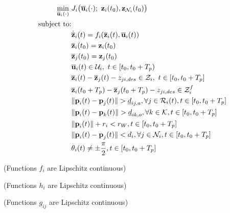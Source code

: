 \begin{align}
  \min\limits_{\overline{\bm{\mathbf{u}}}_i (\cdot)}\ &
    J_i \big(\overline{\bm{\mathbf{u}}}_i (\cdot);\ \bm{\mathbf{z}}_i(t_0), \bm{\mathbf{z}}_{\mathcal{N}_i}(t_0)\big) \\
  \text{subject to:} & \\
  & \dot{\overline{\bm{\mathbf{z}}}}_i(t) = f_i (\overline{\bm{\mathbf{z}}}_i (t), \overline{\bm{\mathbf{u}}}_i (t)) \\
  & \overline{\bm{\mathbf{z}}}_i (t_0) = \bm{\mathbf{z}}_i (t_0) \\
  & \overline{\bm{\mathbf{z}}}_j (t_0) = \bm{\mathbf{z}}_j (t_0) \\
  & \overline{\bm{\mathbf{u}}}_i(t) \in \mathcal{U}_i,\ t \in [t_0, t_0 + T_p)\\
  & \overline{\bm{\mathbf{z}}}_i (t) - \overline{\bm{\mathbf{z}}}_j (t) - z_{ji, des} \in \mathcal{Z}_i,\ t \in [t_0, t_0 + T_p]\\
  & \overline{\bm{\mathbf{z}}}_i (t_0 + T_p) - \overline{\bm{\mathbf{z}}}_j (t_0 + T_p) - z_{ji,des} \in \mathcal{Z}_i^f \\
  & \|\bm{\mathbf{p}}_i(t) - \bm{\mathbf{p}}_j(t)\| > \underline{d}_{ij,a}, \forall j \in \mathcal{R}_i(t), t \in [t_0, t_0 + T_p] \\
  & \|\bm{\mathbf{p}}_i(t) - \bm{\mathbf{p}}_k(t)\| > \underline{d}_{ik,o}, \forall k \in \mathcal{K}, t \in [t_0, t_0 + T_p] \\
  & \|\bm{\mathbf{p}}_i(t)\| + r_i < r_W, t \in [t_0, t_0 + T_p] \\
  & \|\bm{\mathbf{p}}_i(t) - \bm{\mathbf{p}}_j(t)\| < d_i, \forall j \in \mathcal{N}_i, t \in [t_0, t_0 + T_p] \\
  & \theta_i(t) \ne \pm \frac{\pi}{2}, t \in [t_0, t_0 + T_p]
\end{align}


\begin{gg_box}
\begin{assumption} (Functions $f_i$ are Lipschitz continuous)
  \label{ass:f_i_Lipschitz}
\end{assumption}
\end{gg_box}

\begin{gg_box}
\begin{assumption} (Functions $h_i$ are Lipschitz continuous)
  \label{ass:h_i_Lipschitz}
\end{assumption}
\end{gg_box}

\begin{gg_box}
\begin{assumption} (Functions $g_{ij}$ are Lipschitz continuous)
  \label{ass:g_ij_Lipschitz}
\end{assumption}
\end{gg_box}

